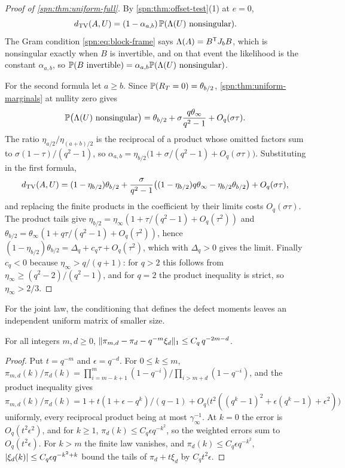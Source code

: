 \begin{proof}[Proof of \cref{spn:thm:uniform-full}]
By \cref{spn:thm:offset-test}(1) at $e=0$,
\[
 d_{\mathrm{TV}}(A,U)=(1-\alpha_{a,b})\,\mathbb{P}(\Lambda(U)\text{ nonsingular}).
\]
The Gram condition \eqref{spn:eq:block-frame} says
$\Lambda(A)=B^{\mathsf{T}}J_bB$, which is nonsingular exactly when $B$ is invertible, and on that event the
likelihood is the constant $\alpha_{a,b}$, so
$\mathbb{P}(B\text{ invertible})=\alpha_{a,b}\mathbb{P}(\Lambda(U)\text{ nonsingular})$.

For the second formula let $a\ge b$. Since $\mathbb{P}(R_T=0)=\theta_{b/2}$, \cref{spn:thm:uniform-marginals} at
nullity zero gives
\begin{equation}\label{spn:eq:defect-zero}
 \mathbb{P}\bigl(\Lambda(U)\text{ nonsingular}\bigr)=\theta_{b/2}+\sigma\frac{q\theta_\infty}{q^2-1}
 +O_q(\sigma\tau).
\end{equation}
The ratio $\eta_{a/2}/\eta_{(a+b)/2}$ is the reciprocal of a product whose omitted factors sum to
$\sigma(1-\tau)/(q^2-1)$, so $\alpha_{a,b}=\eta_{b/2}\bigl(1+\sigma/(q^2-1)+O_q(\sigma\tau)\bigr)$.
Substituting in the first formula,
\[
 d_{\mathrm{TV}}(A,U)=(1-\eta_{b/2})\theta_{b/2}
 +\frac{\sigma}{q^2-1}\bigl((1-\eta_{b/2})q\theta_\infty-\eta_{b/2}\theta_{b/2}\bigr)+O_q(\sigma\tau),
\]
and replacing the finite products in the coefficient by their limits costs $O_q(\sigma\tau)$.
The product tails give $\eta_{b/2}=\eta_\infty(1+\tau/(q^2-1)+O_q(\tau^2))$ and
$\theta_{b/2}=\theta_\infty(1+q\tau/(q^2-1)+O_q(\tau^2))$, hence
$(1-\eta_{b/2})\theta_{b/2}=\Delta_q+c_q\tau+O_q(\tau^2)$, which with $\Delta_q>0$ gives the
limit. Finally
$c_q<0$ because $\eta_\infty>q/(q+1)$: for $q>2$ this follows from
$\eta_\infty\ge(q^2-2)/(q^2-1)$, and for $q=2$ the product inequality is strict, so
$\eta_\infty>2/3$.
\end{proof}

For the joint law, the conditioning that defines the defect moments leaves an independent uniform
matrix of smaller size.

\begin{lemma}\label{spn:lem:finite-rect}
For all integers $m,d\ge0$,
$\lVert\pi_{m,d}-\pi_d-q^{-m}\xi_d\rVert_1\le C_q\,q^{-2m-d}$.
\end{lemma}

\begin{proof}
Put $t=q^{-m}$ and $\epsilon=q^{-d}$. For $0\le k\le m$,
$\pi_{m,d}(k)/\pi_d(k)=\prod_{i=m-k+1}^m(1-q^{-i})/\prod_{i>m+d}(1-q^{-i})$, and the product
inequality gives
$\pi_{m,d}(k)/\pi_d(k)=1+t(1+\epsilon-q^k)/(q-1)+O_q\bigl(t^2((q^k-1)^2+\epsilon(q^k-1)+\epsilon^2)\bigr)$
uniformly, every reciprocal product being at most $\gamma_\infty^{-1}$. At $k=0$ the error is
$O_q(t^2\epsilon^2)$, and for $k\ge1$, $\pi_d(k)\le C_q\epsilon q^{-k^2}$, so the weighted errors
sum to $O_q(t^2\epsilon)$. For $k>m$ the finite law vanishes, and
$\pi_d(k)\le C_q\epsilon q^{-k^2}$, $\lvert\xi_d(k)\rvert\le C_q\epsilon q^{-k^2+k}$ bound the tails of
$\pi_d+t\xi_d$ by $C_qt^2\epsilon$.
\end{proof}

